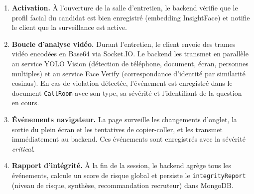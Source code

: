 \begin{sloppypar}
\begin{enumerate}
  \item \textbf{Activation.} À l'ouverture de la salle d'entretien, le backend vérifie que
        le profil facial du candidat est bien enregistré (embedding InsightFace) et notifie
        le client que la surveillance est active.

  \item \textbf{Boucle d'analyse vidéo.} Durant l'entretien, le client envoie des trames
        vidéo encodées en Base64 via Socket.IO. Le backend les transmet en parallèle au service
        YOLO Vision (détection de téléphone, document, écran, personnes multiples) et au
        service Face Verify (correspondance d'identité par similarité cosinus). En cas de
        violation détectée, l'événement est enregistré dans le document \texttt{CallRoom}
        avec son type, sa sévérité et l'identifiant de la question en cours.

  \item \textbf{Événements navigateur.} La page surveille les changements d'onglet, la
        sortie du plein écran et les tentatives de copier-coller, et les transmet immédiatement
        au backend. Ces événements sont enregistrés avec la sévérité \textit{critical}.

  \item \textbf{Rapport d'intégrité.} À la fin de la session, le backend agrège tous les
        événements, calcule un score de risque global et persiste le
        \texttt{integrityReport} (niveau de risque, synthèse, recommandation recruteur)
        dans MongoDB.
\end{enumerate}
\end{sloppypar}

